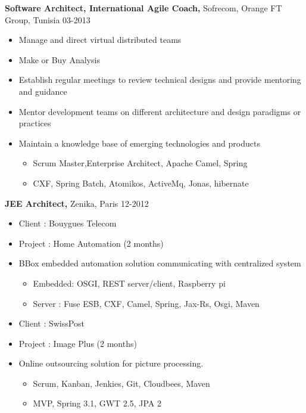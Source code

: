 \documentclass{res}
\begin{document}
\begin{resume}
{\bf Software Architect, International Agile Coach, } Sofrecom, Orange FT Group, Tunisia \hfill   03-2013
\begin{itemize} \itemsep -2pt  %
\item Manage and direct virtual distributed teams
\item Make or Buy Analysis
\item	Establish regular meetings to review technical designs and provide mentoring and guidance
\item	Mentor development teams on different architecture and design paradigms or practices
\item	Maintain a knowledge base of emerging technologies and products
\begin{itemize} \itemsep -2pt  %
\item	Scrum Master,Enterprise Architect, Apache Camel, Spring
\item	CXF, Spring Batch, Atomikos, ActiveMq, Jonas, hibernate
\end{itemize}
\end{itemize}

{\bf JEE Architect,} Zenika, Paris \hfill   12-2012
\begin{itemize} \itemsep -2pt  %
\item	Client : Bouygues Telecom
\item	Project : Home Automation (2 months)
\item	BBox embedded automation solution communicating with centralized system
\begin{itemize} \itemsep -2pt  %
\item Embedded: OSGI, REST server/client, Raspberry pi
\item Server : Fuse ESB, CXF, Camel, Spring, Jax-Rs, Osgi, Maven
\end{itemize}

\item	Client : SwissPost
\item	Project : Image Plus (2 months)
\item	Online outsourcing solution for picture processing.
\begin{itemize} \itemsep -2pt  %
\item Scrum, Kanban, Jenkies, Git, Cloudbees, Maven
\item MVP, Spring 3.1, GWT 2.5, JPA 2
\end{itemize}
\end{itemize}


\end{resume}
\end{document}
